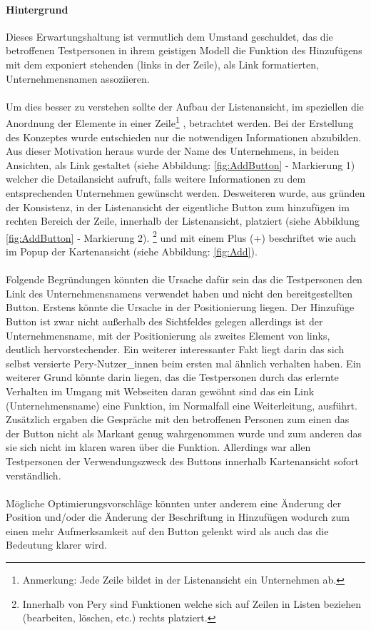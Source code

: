 \documentclass[Bachelorarbeit.tex]{subfiles}
\begin{document}
\paragraph{Hintergrund}
Dieses Erwartungshaltung ist vermutlich dem Umstand geschuldet, das die betroffenen Testpersonen in ihrem geistigen Modell die Funktion des Hinzufügens mit dem exponiert stehenden (links in der Zeile), als Link formatierten, Unternehmensnamen assoziieren. \\
\\
Um dies besser zu verstehen sollte der Aufbau der Listenansicht, im speziellen die Anordnung der Elemente in einer Zeile\footnote
{
	Anmerkung: Jede Zeile bildet in der Listenansicht ein Unternehmen ab.
	}
, betrachtet werden.
Bei der Erstellung des Konzeptes wurde entschieden nur die notwendigen Informationen abzubilden. Aus dieser Motivation heraus wurde der Name des Unternehmens, in beiden Ansichten, als Link gestaltet (siehe Abbildung: \ref{fig:AddButton} - Markierung 1) welcher die Detailansicht aufruft, falls weitere Informationen zu dem entsprechenden Unternehmen gewünscht werden.
Desweiteren wurde, aus gründen der Konsistenz, in der Listenansicht der eigentliche Button zum hinzufügen im rechten Bereich der Zeile, innerhalb der Listenansicht, platziert (siehe Abbildung \ref{fig:AddButton} - Markierung 2). 
\footnote{
	Innerhalb von Pery sind Funktionen welche sich auf Zeilen in Listen beziehen (bearbeiten, löschen, etc.) rechts platziert.
	} 
und mit einem Plus (+) beschriftet wie auch im Popup der Kartenansicht (siehe Abbildung: \ref{fig:Add}).\\
\\
Folgende Begründungen könnten die Ursache dafür sein das die Testpersonen den Link des Unternehmensnamens verwendet haben und nicht den bereitgestellten Button.
Erstens könnte die Ursache in der Positionierung liegen. 
Der Hinzufüge Button ist zwar nicht außerhalb des Sichtfeldes gelegen allerdings ist der Unternehmensname, mit der Positionierung als zweites Element von links, deutlich hervorstechender.
Ein weiterer interessanter Fakt liegt darin das sich selbst versierte Pery-Nutzer\_innen beim ersten mal ähnlich verhalten haben. 
Ein weiterer Grund könnte darin liegen, das die Testpersonen durch das erlernte Verhalten im Umgang mit Webseiten daran gewöhnt sind das ein Link (Unternehmensname) eine Funktion, im Normalfall eine Weiterleitung, ausführt.
Zusätzlich ergaben die Gespräche mit den betroffenen Personen zum einen das der Button nicht als Markant genug wahrgenommen wurde und zum anderen das sie sich nicht im klaren waren über die Funktion. 
Allerdings war allen Testpersonen der Verwendungszweck des Buttons innerhalb Kartenansicht sofort verständlich.\\
\\
Mögliche Optimierungsvorschläge könnten unter anderem eine Änderung der Position und/oder die Änderung der Beschriftung in Hinzufügen wodurch zum einen mehr Aufmerksamkeit auf den Button gelenkt wird als auch das die Bedeutung klarer wird.
\end{document}
